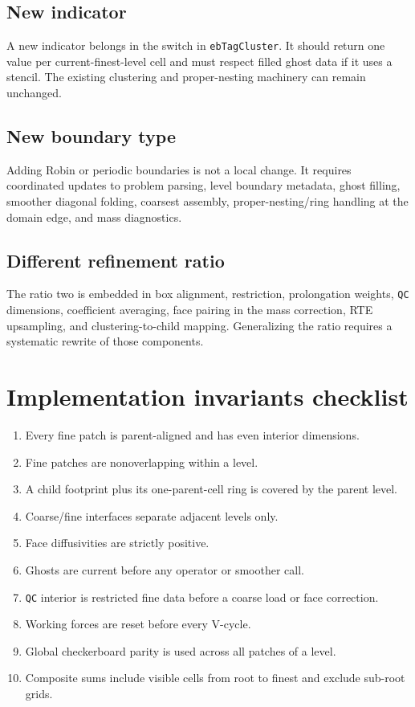 \documentclass[11pt,oneside,openany]{book}
\newcommand{\code}[1]{\textnormal{\texttt{#1}}}
\begin{document}
\subsection{New indicator}
A new indicator belongs in the switch in \code{ebTagCluster}. It should return one value per current-finest-level cell and must respect filled ghost data if it uses a stencil. The existing clustering and proper-nesting machinery can remain unchanged.

\subsection{New boundary type}
Adding Robin or periodic boundaries is not a local change. It requires coordinated updates to problem parsing, level boundary metadata, ghost filling, smoother diagonal folding, coarsest assembly, proper-nesting/ring handling at the domain edge, and mass diagnostics.

\subsection{Different refinement ratio}
The ratio two is embedded in box alignment, restriction, prolongation weights, \code{QC} dimensions, coefficient averaging, face pairing in the mass correction, RTE upsampling, and clustering-to-child mapping. Generalizing the ratio requires a systematic rewrite of those components.

\section{Implementation invariants checklist}
\begin{enumerate}[label=\arabic*.]
\item Every fine patch is parent-aligned and has even interior dimensions.
\item Fine patches are nonoverlapping within a level.
\item A child footprint plus its one-parent-cell ring is covered by the parent level.
\item Coarse/fine interfaces separate adjacent levels only.
\item Face diffusivities are strictly positive.
\item Ghosts are current before any operator or smoother call.
\item \code{QC} interior is restricted fine data before a coarse load or face correction.
\item Working forces are reset before every V-cycle.
\item Global checkerboard parity is used across all patches of a level.
\item Composite sums include visible cells from root to finest and exclude sub-root grids.
\end{enumerate}
\end{document}
